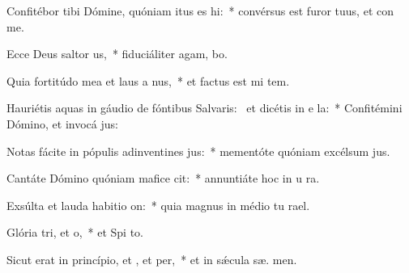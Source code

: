 \item Confitébor tibi Dómine, quóniam itus es hi:~* convérsus est furor tuus, et con  me.
\item Ecce Deus saltor us,~* fiduciáliter agam,   bo.
\item Quia fortitúdo mea et laus a nus,~* et factus est mi  tem.
\item Hauriétis aquas in gáudio de fóntibus Salvaris:~\pscross{} et dicétis in e la:~* Confitémini Dómino, et invocá  jus:
\item Notas fácite in pópulis adinventines jus:~* mementóte quóniam excélsum   jus.
\item Cantáte Dómino quóniam mafice cit:~* annuntiáte hoc in u ra.
\item Exsúlta et lauda habitio on:~* quia magnus in médio tu  rael.
\item Glória tri, et o,~* et Spi to.
\item Sicut erat in princípio, et , et per,~* et in sǽcula sæ. men.
